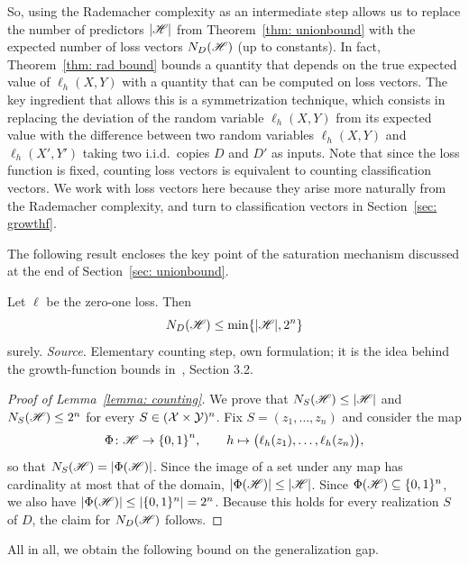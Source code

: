 \documentclass[reqno]{amsart}
\begin{document}
So, using the Rademacher complexity as an intermediate step allows us to replace the number of predictors $\vert\mathscr{H}\vert$ from Theorem~\ref{thm: unionbound} with the expected number of loss vectors $N_D(\mathscr{H})$ (up to constants). 
In fact, Theorem~\ref{thm: rad bound} bounds a quantity that depends on the true expected value of $\ell_h(X,Y)$ with a quantity that can be computed on loss vectors. The key ingredient that allows this is a symmetrization technique, which consists in replacing the deviation of the random variable $\ell_h(X,Y)$ from its expected value with the difference between two random variables $\ell_h(X,Y)$ and $\ell_h(X',Y')$ taking two i.i.d.\ copies $D$ and $D'$ as inputs. Note that since the loss function is fixed, counting loss vectors is equivalent to counting classification vectors. We work with loss vectors here because they arise more naturally from the Rademacher complexity, and turn to classification vectors in Section~\ref{sec: growthf}. 

The following result encloses the key point of the saturation mechanism discussed at the end of Section~\ref{sec: unionbound}. 

\begin{lemma}[Counting]\label{lemma: counting} Let $\ell$ be the zero-one loss. Then
\[
N_{D}(\mathscr{H}) \le \min\{\vert\mathscr{H}\vert, 2^n\} 
\]
surely.
\textnormal{\emph{Source.} Elementary counting step, own formulation; it is the idea behind the growth-function bounds in~\cite{mohri2018foundations}, Section 3.2.}

\begin{proof}[Proof of Lemma~\ref{lemma: counting}]
  We prove that $N_S(\mathscr{H})\le \vert\mathscr{H}\vert$ and $N_S(\mathscr{H})\le 2^n$ for every $S\in(\mathcal{X}\times\mathcal{Y})^n$.
Fix $S=(z_1,\dots,z_n)$ and consider the map
\[
\Phi\colon \mathscr{H} \to {\{0,1\}}^n,\qquad
h \mapsto \bigl(\ell_h(z_1),\dots,\ell_h(z_n)\bigr),
\]
so that $N_S(\mathscr{H})=|\Phi(\mathscr{H})|$. Since the image of a set under any map
has cardinality at most that of the domain, $|\Phi(\mathscr{H})|\le|\mathscr{H}|$.
Since $\Phi(\mathscr{H})\subseteq\{0,1\}^n$, we also have
$|\Phi(\mathscr{H})|\le|\{0,1\}^n|=2^n$. Because this holds for every realization $S$ of $D$, the claim for $N_D(\mathscr{H})$ follows. 
\end{proof}
\end{lemma} 


All in all, we obtain the following bound on the generalization gap. 
\end{document}
